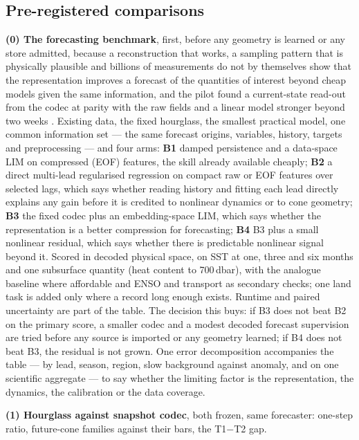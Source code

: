 \documentclass[10pt]{article}
\begin{document}
\subsection{Pre-registered comparisons}\label{sec:eval-compare}

\textbf{(0) The forecasting benchmark}, first, before any geometry is
learned or any store admitted, because a reconstruction that works, a
sampling pattern that is physically plausible and billions of measurements
do not by themselves show that the representation improves a forecast of
the quantities of interest beyond cheap models given the same information,
and the pilot found a current-state read-out from the codec at parity with
the raw fields and a linear model stronger beyond two weeks
\cite{techreport}. Existing data, the fixed hourglass, the smallest
practical model, one common information set --- the same forecast origins,
variables, history, targets and preprocessing --- and four arms:
\textbf{B1} damped persistence and a data-space LIM on compressed
(EOF) features, the skill already available cheaply; \textbf{B2} a direct
multi-lead regularised regression on compact raw or EOF features over
selected lags, which says whether reading history and fitting each lead
directly explains any gain before it is credited to nonlinear dynamics or
to cone geometry; \textbf{B3} the fixed codec plus an embedding-space LIM,
which says whether the representation is a better compression for
forecasting; \textbf{B4} B3 plus a small nonlinear residual, which says
whether there is predictable nonlinear signal beyond it. Scored in decoded
physical space, on SST at one, three and six months and one subsurface
quantity (heat content to 700\,dbar), with the analogue baseline where
affordable and ENSO and transport as secondary checks; one land task is
added only where a record long enough exists. Runtime and paired
uncertainty are part of the table. The decision this buys: if B3 does not
beat B2 on the primary score, a smaller codec and a modest decoded forecast
supervision are tried before any source is imported or any geometry
learned; if B4 does not beat B3, the residual is not grown. One error
decomposition accompanies the table --- by lead, season, region, slow
background against anomaly, and on one scientific aggregate --- to say
whether the limiting factor is the representation, the dynamics, the
calibration or the data coverage.

\textbf{(1) Hourglass against snapshot codec}, both frozen, same forecaster:
one-step ratio, future-cone families against their bars, the T1$-$T2 gap.
\end{document}
